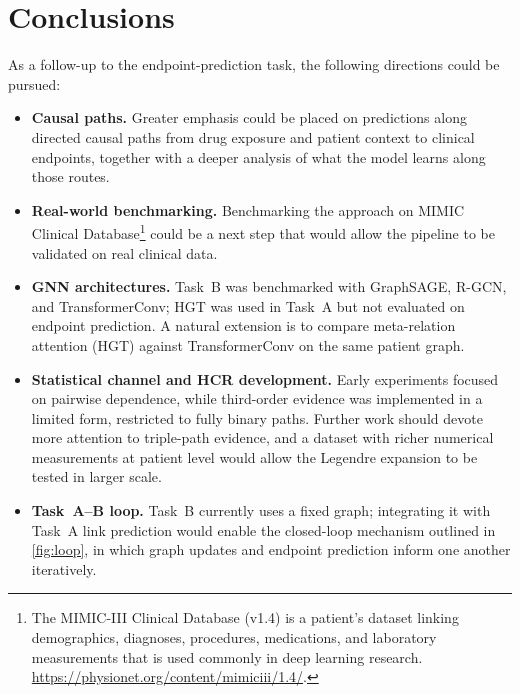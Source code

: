 \newpage %
\section{Conclusions}

As a follow-up to the endpoint-prediction task, the following directions
could be pursued:

\begin{itemize}[label=\textendash]
  \item \textbf{Causal paths.}
  Greater emphasis could be placed on predictions along directed causal
  paths from drug exposure and patient context to clinical endpoints, together
  with a deeper analysis of what the model learns along those routes.

  \item \textbf{Real-world benchmarking.}
  Benchmarking the approach on MIMIC Clinical Database\footnote{%
    The MIMIC-III Clinical Database (v1.4) is a patient's dataset linking demographics, diagnoses, procedures, medications, and
    laboratory measurements that is used commonly in deep learning research.
    \url{https://physionet.org/content/mimiciii/1.4/}.%
  }
  could be a next step that would allow the pipeline to be validated on real clinical data.

  \item \textbf{GNN architectures.}
   Task~B was benchmarked with GraphSAGE, R-GCN, and TransformerConv; HGT was
    used in Task~A but not evaluated on endpoint prediction. A natural extension
    is to compare meta-relation attention (HGT) against TransformerConv on the
    same patient graph.

   \item \textbf{Statistical channel and HCR development.}
    Early experiments focused on pairwise dependence, while third-order evidence
    was implemented in a limited form, restricted to fully binary paths. Further
    work should devote more attention to triple-path evidence, and a dataset with
    richer numerical measurements at patient level would allow the Legendre
    expansion to be tested in larger scale.

  \item \textbf{Task~A--B loop.}
  Task~B currently uses a fixed graph; integrating it with Task~A link
  prediction would enable the closed-loop mechanism outlined in
  \cref{fig:loop}, in which graph updates and endpoint prediction inform one
  another iteratively.
\end{itemize}